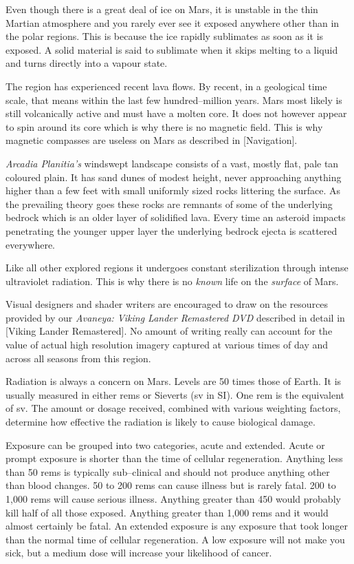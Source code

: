 Even though there is a great deal of ice on Mars, it is unstable in the thin Martian atmosphere and you rarely ever see it exposed anywhere other than in the polar regions. This is because the ice rapidly sublimates as soon as it is exposed. A solid material is said to sublimate when it skips melting to a liquid and turns directly into a vapour state.

The region has experienced recent lava flows. By recent, in a geological time scale, that means within the last few hundred--million years. Mars most likely is still volcanically active and must have a molten core. It does not however appear to spin around its core which is why there is no magnetic field. This is why magnetic compasses are useless on Mars as described in [Navigation].

{\it Arcadia Planitia's} windswept landscape consists of a vast, mostly flat, pale tan coloured plain. It has sand dunes of modest height, never approaching anything higher than a few feet with small uniformly sized rocks littering the surface. As the prevailing theory goes these rocks are remnants of some of the underlying bedrock which is an older layer of solidified lava. Every time an asteroid impacts penetrating the younger upper layer the underlying bedrock ejecta is scattered everywhere.

Like all other explored regions it undergoes constant sterilization through intense ultraviolet radiation. This is why there is no {\it known} life on the {\it surface} of Mars.

Visual designers and shader writers are encouraged to draw on the resources provided by our {\it Avaneya: Viking Lander Remastered DVD} described in detail in [Viking Lander Remastered]. No amount of writing really can account for the value of actual high resolution imagery captured at various times of day and across all seasons from this region.


Radiation is always a concern on Mars. Levels are 50 times those of Earth. It is usually measured in either rems or Sieverts (sv in SI). One rem is the equivalent of  sv. The amount or dosage received, combined with various weighting factors, determine how effective the radiation is likely to cause biological damage.

Exposure can be grouped into two categories, acute and extended. Acute or prompt exposure is shorter than the time of cellular regeneration. Anything less than 50 rems is typically sub--clinical and should not produce anything other than blood changes. 50 to 200 rems can cause illness but is rarely fatal. 200 to 1,000 rems will cause serious illness. Anything greater than 450 would probably kill half of all those exposed. Anything greater than 1,000 rems and it would almost certainly be fatal. An extended exposure is any exposure that took longer than the normal time of cellular regeneration. A low exposure will not make you sick, but a medium dose will increase your likelihood of cancer.

